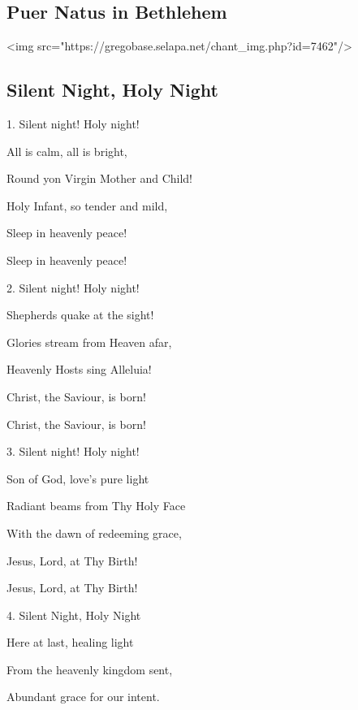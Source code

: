 \subsection{Puer Natus in Bethlehem}\label{puer_natus}
\begin{description}[nosep,leftmargin=\parindent,labelsep=0pt]
\item <img src="https://gregobase.selapa.net/chant_img.php?id=7462"/> 
\end{description}
\subsection{Silent Night, Holy Night}\label{silent_night}
\begin{description}[nosep,leftmargin=\parindent,labelsep=0pt]
\item 1. Silent night! Holy night! 
\item All is calm, all is bright, 
\item Round yon Virgin Mother and Child! 
\item Holy Infant, so tender and mild, 
\item Sleep in heavenly peace! 
\item Sleep in heavenly peace! 
\vspace{1.5ex}
\item 2. Silent night! Holy night! 
\item Shepherds quake at the sight! 
\item Glories stream from Heaven afar, 
\item Heavenly Hosts sing Alleluia! 
\item Christ, the Saviour, is born! 
\item Christ, the Saviour, is born! 
\vspace{1.5ex}
\item 3. Silent night! Holy night! 
\item Son of God, love’s pure light 
\item Radiant beams from Thy Holy Face 
\item With the dawn of redeeming grace, 
\item Jesus, Lord, at Thy Birth! 
\item Jesus, Lord, at Thy Birth! 
\vspace{1.5ex}
\item 4. Silent Night, Holy Night 
\item Here at last, healing light 
\item From the heavenly kingdom sent, 
\item Abundant grace for our intent. 

\end{description}
